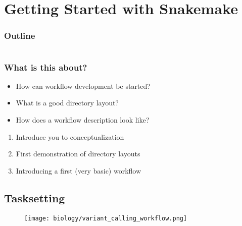 \section{Getting Started with Snakemake}

\begin{frame}
    \frametitle{Outline}
    \begin{columns}[t]
        \begin{column}{.5\textwidth}
            \tableofcontents[sections={1-9},currentsection]
        \end{column}
        \begin{column}{.5\textwidth}
            \tableofcontents[sections={10-18},currentsection]
        \end{column}
    \end{columns}
\end{frame}

\begin{frame}
	\frametitle{What is this about?}
	\begin{question}[Questions]
		\begin{itemize}
			\item How can workflow development be started?
			\item What is a good directory layout?
			\item How does a workflow description look like?
		\end{itemize}
	\end{question}
	\begin{docs}[Objectives]
		\begin{enumerate}
			\item Introduce you to conceptualization
			\item First demonstration of directory layouts
			\item Introducing a first (very basic) workflow
		\end{enumerate}
	\end{docs}
\end{frame}

\subsection{Tasksetting}

\begin{frame}
  \begin{figure}
    \centering
    \texttt{[image: biology/variant\_calling\_workflow.png]}
  \end{figure}
\end{frame}

